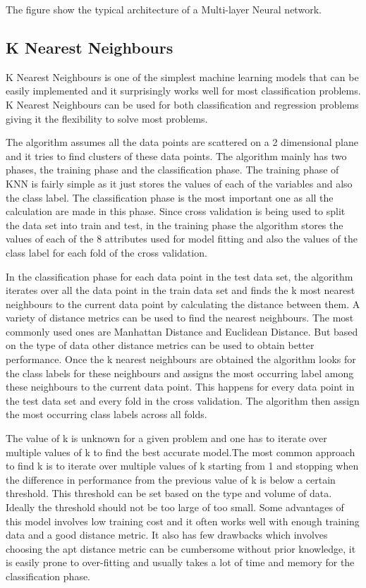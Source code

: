 \documentclass[sigconf]{acmart}
\begin{document}
The figure show the typical architecture of a Multi-layer Neural network. 

\subsection{K Nearest Neighbours}

K Nearest Neighbours is one of the simplest machine learning models that can be easily implemented and it surprisingly works well for most classification problems. K Nearest Neighbours can be used for both classification and regression problems giving it the flexibility to solve most problems.

The algorithm assumes all the data points are scattered on a 2 dimensional plane and it tries to find clusters of these data points. The algorithm mainly has two phases, the training phase and the classification phase. The training phase of KNN is fairly simple as it just stores the values of each of the variables and also the class label. The classification phase is the most important one as all the calculation are made in this phase. Since cross validation is being used to split the data set into train and test, in the training phase the algorithm stores the values of each of the 8 attributes used for model fitting and also the values of the class label for each fold of the cross validation.

In the classification phase for each data point in the test data set, the algorithm iterates over all the data point in the train data set and finds the k most nearest neighbours to the current data point by calculating the distance between them. A variety of distance metrics can be used to find the nearest neighbours. The most commonly used ones are Manhattan Distance and Euclidean Distance. But based on the type of data other distance metrics can be used to obtain better performance. Once the k nearest neighbours are obtained the algorithm looks for the class labels for these neighbours and assigns the most occurring label among these neighbours to the current data point. This happens for every data point in the test data set and every fold in the cross validation. The algorithm then assign the most occurring class labels across all folds.

The value of k is unknown for a given problem and one has to iterate over multiple values of k to find the best accurate model.The most common approach to find k is to iterate over multiple values of k starting from 1 and stopping when the difference in performance from the previous value of k is below a certain threshold. This threshold can be set based on the type and volume of data. Ideally the threshold should not be too large of too small. Some advantages of this model involves low training cost and it often works well with enough training data and a good distance metric. It also has few drawbacks which involves choosing the apt distance metric can be cumbersome without prior knowledge, it is easily prone to over-fitting and usually takes a lot of time and memory for the classification phase.
\end{document}
